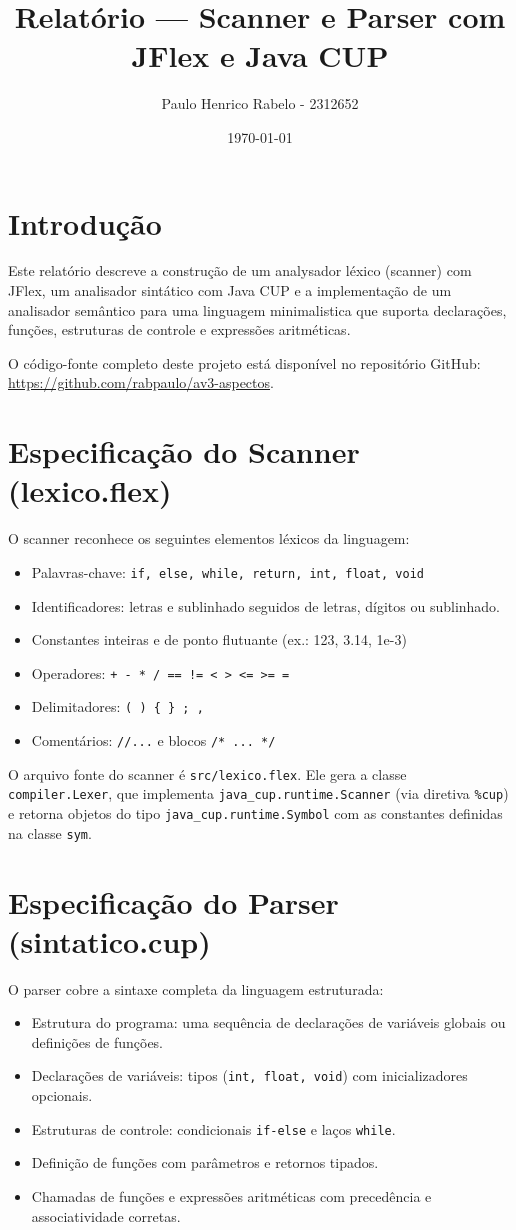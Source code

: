 \documentclass[a4paper,12pt]{article}
\title{Relatório — Scanner e Parser com JFlex e Java CUP}
\author{Paulo Henrico Rabelo - 2312652}
\date{\today}
\begin{document}
\maketitle
\tableofcontents
\newpage

\section{Introdução}
Este relatório descreve a construção de um analysador léxico (scanner) com JFlex, um analisador sintático com Java CUP e a implementação de um analisador semântico para uma linguagem minimalistica que suporta declarações, funções, estruturas de controle e expressões aritméticas.

O código-fonte completo deste projeto está disponível no repositório GitHub: \url{https://github.com/rabpaulo/av3-aspectos}.

\section{Especificação do Scanner (lexico.flex)}
O scanner reconhece os seguintes elementos léxicos da linguagem:
\begin{itemize}
  \item Palavras-chave: \texttt{if, else, while, return, int, float, void}
  \item Identificadores: letras e sublinhado seguidos de letras, dígitos ou sublinhado.
  \item Constantes inteiras e de ponto flutuante (ex.: 123, 3.14, 1e-3)
  \item Operadores: \verb|+ - * / == != < > <= >= =|
  \item Delimitadores: \texttt{( ) \{ \} ; ,}
  \item Comentários: \texttt{//...} e blocos \texttt{/* ... */}
\end{itemize}

O arquivo fonte do scanner é \texttt{src/lexico.flex}. Ele gera a classe \texttt{compiler.Lexer}, que implementa \texttt{java\_cup.runtime.Scanner} (via diretiva \texttt{\%cup}) e retorna objetos do tipo \texttt{java\_cup.runtime.Symbol} com as constantes definidas na classe \texttt{sym}.

\section{Especificação do Parser (sintatico.cup)}
O parser cobre a sintaxe completa da linguagem estruturada:
\begin{itemize}
  \item Estrutura do programa: uma sequência de declarações de variáveis globais ou definições de funções.
  \item Declarações de variáveis: tipos (\texttt{int, float, void}) com inicializadores opcionais.
  \item Estruturas de controle: condicionais \texttt{if-else} e laços \texttt{while}.
  \item Definição de funções com parâmetros e retornos tipados.
  \item Chamadas de funções e expressões aritméticas com precedência e associatividade corretas.
\end{itemize}
\end{document}
